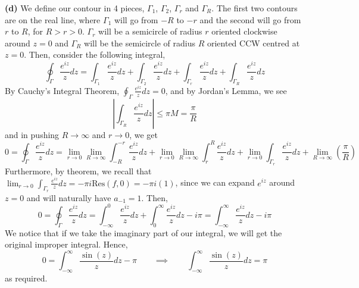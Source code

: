 \documentclass[10pt]{article}
\begin{document}
\textbf{(d)}
We define our contour in 4 pieces, $\Gamma_{1}$, $\Gamma_{2}$, $\Gamma_{r}$ and $\Gamma_{R}$. The first two contours are on the real line, where $\Gamma_{1}$ will go from $-R$ to $-r$ and the second will go from $r$ to $R$, for $R > r > 0$. $\Gamma_{r}$ will be a semicircle of radius $r$ oriented clockwise around $z=0$ and $\Gamma_{R}$ will be the semicircle of radius $R$ oriented CCW centred at $z=0$. Then, consider the following integral,
$$\oint_{\Gamma}\frac{e^{iz}}{z}dz = \int_{\Gamma_{1}}\frac{e^{iz}}{z}dz + \int_{\Gamma_{2}}\frac{e^{iz}}{z}dz + \int_{\Gamma_{r}}\frac{e^{iz}}{z}dz + \int_{\Gamma_{R}}\frac{e^{iz}}{z}dz$$
By Cauchy's Integral Theorem, $\oint_{\Gamma}\frac{e^{iz}}{z}dz = 0$, and by Jordan's Lemma, we see
$$\left|\int_{\Gamma_{R}}\frac{e^{iz}}{z}dz\right| \leq \pi M = \frac{\pi}{R}$$
and in pushing $R \to \infty$ and $r \to 0$, we get
$$0 = \oint_{\Gamma}\frac{e^{iz}}{z}dz = \lim_{r\to 0}\lim_{R\to\infty}\int_{-R}^{-r}\frac{e^{iz}}{z}dz + \lim_{r\to 0}\lim_{R\to\infty}\int_{r}^{R}\frac{e^{iz}}{z}dz + \lim_{r\to 0}\int_{\Gamma_{r}}\frac{e^{iz}}{z}dz + \lim_{R\to \infty}\left(\frac{\pi}{R}\right)$$
Furthermore, by theorem, we recall that $\lim_{r\to 0}\int_{\Gamma_{r}}\frac{e^{iz}}{z}dz = -\pi i \text{Res}(f,0) = -\pi i (1)$, since we can expand $e^{iz}$ around $z=0$ and will naturally have $a_{-1} = 1$. Then,
$$0 = \oint_{\Gamma}\frac{e^{iz}}{z}dz = \int_{-\infty}^{0}\frac{e^{iz}}{z}dz + \int_{0}^{\infty}\frac{e^{iz}}{z}dz - i\pi = \int_{-\infty}^{\infty}\frac{e^{iz}}{z}dz -i\pi$$
We notice that if we take the imaginary part of our integral, we will get the original improper integral. Hence,
$$0 = \int_{-\infty}^{\infty}\frac{\sin(z)}{z}dz - \pi \hspace{2em} \implies \hspace{2em}\int_{-\infty}^{\infty}\frac{\sin(z)}{z}dz= \pi$$
as required.
\end{document}
